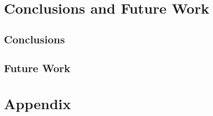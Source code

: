 \documentclass{article}
\theoremstyle{definition}
\begin{document}
\section{Conclusions and Future Work}
\label{sec:conclusion}

\subsection{Conclusions}

\subsection{Future Work}

\printbibliography

\appendix

\section{Appendix}
\label{sec:appendix}
\end{document}

